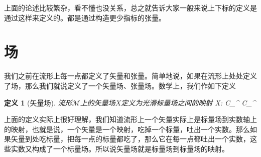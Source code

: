 \documentclass[11pt,a4paper]{ctexbook}
\newtheorem{definition}{\hspace{2em} 定义}[section]
\begin{document}
上面的论述比较繁杂，看不懂也没关系，总之就告诉大家一般来说上下标的定义是通过这样来定义的。都是通过构造更少指标的张量。

\section{场}
我们之前在流形上每一点都定义了矢量和张量。简单地说，如果在流形上处处定义了场，那么我们就说定义了一个矢量场、张量场。数学上，我们作如下定义
\begin{definition}[矢量场]
  流形$\mathcal{M}$上的矢量场$X$定义为光滑标量场之间的映射
  \beq
  X: C_{}^{\infty} \rightarrow C_{}^{\infty}
  \eeq
\end{definition}
上面的定义实际上很好理解，我们知道流形上一个矢量实际上是标量场到实数轴上的映射，也就是说，一个矢量是一个映射，吃掉一个标量，吐出一个实数。那么如果矢量到处吃标量，把每一点的标量都吃了，那么它在每一点都吐出一个实数，这些实数又构成了一个标量场。所以说矢量场就是标量场到标量场的映射。
\end{document}
